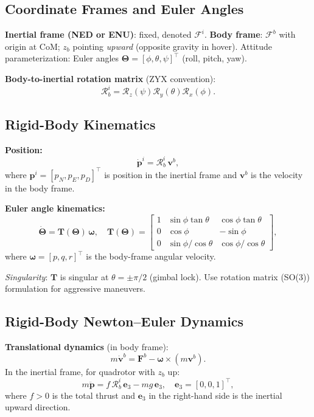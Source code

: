 \documentclass[11pt,a4paper]{article}
\newcommand{\vect}[1]{\bm{#1}}
\begin{document}
\subsection{Coordinate Frames and Euler Angles}

\textbf{Inertial frame (NED or ENU)}: fixed, denoted $\mathcal{F}^i$.
\textbf{Body frame}: $\mathcal{F}^b$ with origin at CoM; $z_b$ pointing \emph{upward} (opposite gravity in hover).
Attitude parameterization: Euler angles $\vect{\Theta} = [\phi,\theta,\psi]^\top$ (roll, pitch, yaw).

\textbf{Body-to-inertial rotation matrix} (ZYX convention):
\[
\mathcal{R}_b^i = \mathcal{R}_z(\psi)\mathcal{R}_y(\theta)\mathcal{R}_x(\phi).
\]

\subsection{Rigid-Body Kinematics}

\textbf{Position:}
\[
\dot{\vect{p}}^i = \mathcal{R}_b^i\,\vect{v}^b,
\]
where $\vect{p}^i = [p_N,p_E,p_D]^\top$ is position in the inertial frame and $\vect{v}^b$ is the velocity in the body frame.

\textbf{Euler angle kinematics:}
\[
\dot{\vect{\Theta}} = \mathbf{T}(\vect{\Theta})\,\vect{\omega},
\quad
\mathbf{T}(\vect{\Theta})
=
\begin{bmatrix}
1 & \sin\phi\tan\theta & \cos\phi\tan\theta\\
0 & \cos\phi & -\sin\phi\\
0 & \sin\phi/\cos\theta & \cos\phi/\cos\theta
\end{bmatrix},
\]
where $\vect\omega=[p,q,r]^\top$ is the body-frame angular velocity.

\textit{Singularity}: $\mathbf{T}$ is singular at $\theta = \pm\pi/2$ (gimbal lock). Use rotation matrix (SO(3)) formulation for aggressive maneuvers.

\subsection{Rigid-Body Newton--Euler Dynamics}

\textbf{Translational dynamics} (in body frame):
\[
m\dot{\vect{v}}^b = \vect{F}^b - \vect{\omega}\times(m\vect{v}^b).
\]
In the inertial frame, for quadrotor with $z_b$ up:
\[
m\ddot{\vect{p}} = f\,\mathcal{R}_b^i\,\vect{e}_3 - mg\,\vect{e}_3,
\quad
\vect{e}_3 = [0,0,1]^\top,
\]
where $f>0$ is the total thrust and $\vect{e}_3$ in the right-hand side is the inertial upward direction.
\end{document}
